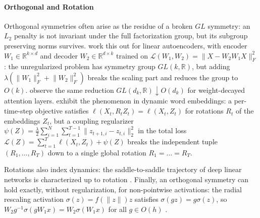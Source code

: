 \documentclass[mathematics,review,submit,moreauthors]{Definitions/mdpi}
\begin{document}
\paragraph{Orthogonal and Rotation}
Orthogonal symmetries often arise as the residue of a broken $GL$ symmetry: an $L_2$ penalty is not invariant under the full factorization group, but its subgroup preserving norms survives.
\citet{kunin2019p3icml} work this out for linear autoencoders, with encoder $W_1\in\mathbb{R}^{k\times d}$ and decoder $W_2\in\mathbb{R}^{d\times k}$ trained on $\mathcal{L}(W_1,W_2)=\lVert X-W_2W_1X\rVert_F^2$: the unregularized problem has symmetry group $GL(k,\mathbb{R})$, but adding $\lambda(\lVert W_1\rVert_F^2+\lVert W_2\rVert_F^2)$ breaks the scaling part and reduces the group to $O(k)$.
\citet{kobayashi2024anips} observe the same reduction $GL(d_k,\mathbb{R})\downarrow O(d_k)$ for weight-decayed attention layers.
\citet{bamler2018p3icml} exhibit the phenomenon in dynamic word embeddings: a per-time-step objective satisfies $\ell(X_t,R_tZ_t)=\ell(X_t,Z_t)$ for rotations $R_t$ of the embeddings $Z_t$, but a coupling regularizer $\psi(Z)=\frac{\lambda}{2}\sum_{i=1}^{N}\sum_{t=1}^{T-1}\lVert z_{t+1,i}-z_{t,i}\rVert_2^2$ in the total loss $\mathcal{L}(Z)=\sum_{t=1}^{T}\ell(X_t,Z_t)+\psi(Z)$ breaks the independent tuple $(R_1,\dots,R_T)$ down to a single global rotation $R_1=\dots=R_T$.

Rotations also index dynamics: the saddle-to-saddle trajectory of deep linear networks is characterized up to rotation \citep{jacot2022}.
Finally, an orthogonal symmetry can hold exactly, without regularization, for non-pointwise activations: the radial rescaling activation $\sigma(z)=f(\lVert z\rVert)z$ satisfies $\sigma(gz)=g\sigma(z)$, so $W_2g^{-1}\sigma(gW_1x)=W_2\sigma(W_1x)$ for all $g\in O(h)$ \citep{zhao2023a}.
\end{document}
